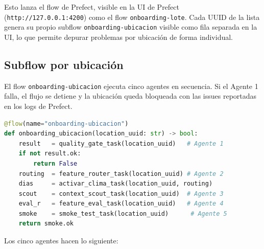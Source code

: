 \documentclass[12pt, a4paper]{article}
\begin{document}
Esto lanza el flow de Prefect, visible en la UI de Prefect (\texttt{http://127.0.0.1:4200}) como el flow \texttt{onboarding-lote}. Cada UUID de la lista genera su propio subflow \texttt{onboarding-ubicacion} visible como fila separada en la UI, lo que permite depurar problemas por ubicación de forma individual.

\subsection{Subflow por ubicación}

El flow \texttt{onboarding-ubicacion} ejecuta cinco agentes en secuencia. Si el Agente 1 falla, el flujo se detiene y la ubicación queda bloqueada con las issues reportadas en los logs de Prefect.

\begin{lstlisting}[language=Python]
@flow(name="onboarding-ubicacion")
def onboarding_ubicacion(location_uuid: str) -> bool:
    result   = quality_gate_task(location_uuid)   # Agente 1
    if not result.ok:
        return False
    routing  = feature_router_task(location_uuid) # Agente 2
    dias     = activar_clima_task(location_uuid, routing)
    scout    = context_scout_task(location_uuid)  # Agente 3
    eval_r   = feature_eval_task(location_uuid)   # Agente 4
    smoke    = smoke_test_task(location_uuid)      # Agente 5
    return smoke.ok
\end{lstlisting}

Los cinco agentes hacen lo siguiente:
\end{document}
